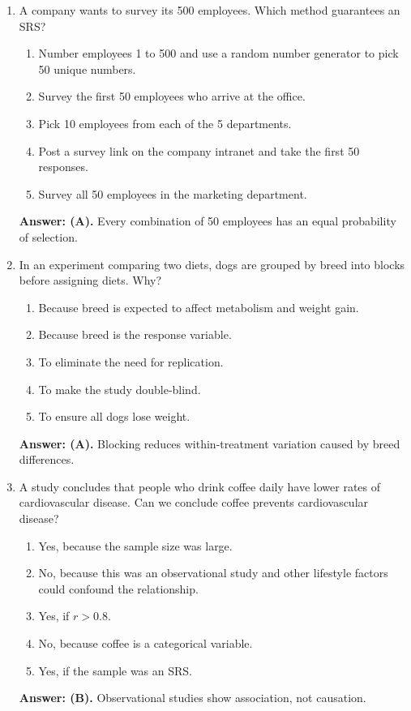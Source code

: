 \begin{enumerate}[resume, leftmargin=1.5em]
  \item A company wants to survey its 500 employees. Which method guarantees an SRS?
  \begin{enumerate}[label=(\Alph*)]
    \item Number employees 1 to 500 and use a random number generator to pick 50 unique numbers.
    \item Survey the first 50 employees who arrive at the office.
    \item Pick 10 employees from each of the 5 departments.
    \item Post a survey link on the company intranet and take the first 50 responses.
    \item Survey all 50 employees in the marketing department.
  \end{enumerate}
  \textbf{Answer: (A).} Every combination of 50 employees has an equal probability of selection.

  \item In an experiment comparing two diets, dogs are grouped by breed into blocks before assigning diets. Why?
  \begin{enumerate}[label=(\Alph*)]
    \item Because breed is expected to affect metabolism and weight gain.
    \item Because breed is the response variable.
    \item To eliminate the need for replication.
    \item To make the study double-blind.
    \item To ensure all dogs lose weight.
  \end{enumerate}
  \textbf{Answer: (A).} Blocking reduces within-treatment variation caused by breed differences.

  \item A study concludes that people who drink coffee daily have lower rates of cardiovascular disease. Can we conclude coffee prevents cardiovascular disease?
  \begin{enumerate}[label=(\Alph*)]
    \item Yes, because the sample size was large.
    \item No, because this was an observational study and other lifestyle factors could confound the relationship.
    \item Yes, if $r > 0.8$.
    \item No, because coffee is a categorical variable.
    \item Yes, if the sample was an SRS.
  \end{enumerate}
  \textbf{Answer: (B).} Observational studies show association, not causation.
\end{enumerate}


